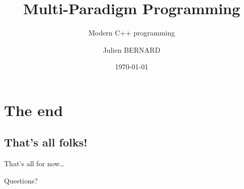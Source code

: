 \documentclass[english,10pt]{beamer}
\title{Multi-Paradigm Programming}
\subtitle{Modern C++ programming}
\author{Julien BERNARD}
\institute[Univ. Franche-Comté]{Université de Franche-Comté, France}
\date{\today}
\begin{document}
\begin{frame}
  \titlepage
\end{frame}







\section*{The end}

\subsection*{That's all folks!}

\begin{frame}{That's all for now\ldots}{}
  \begin{block}{}
    \begin{center}
      Questions?
    \end{center}
  \end{block}
\end{frame}


\end{document}
